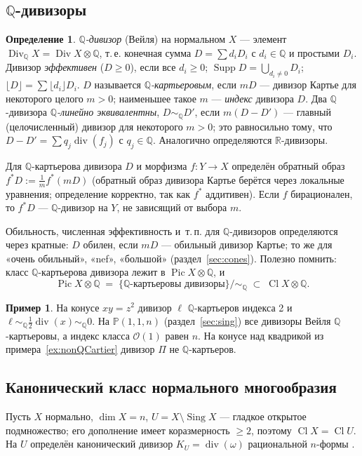 \documentclass[11pt,a4paper]{article}
\theoremstyle{plain}
\theoremstyle{definition}
\newtheorem{definition}[theorem]{Определение}
\newtheorem{example}[theorem]{Пример}
\theoremstyle{remark}
\newcommand{\Q}{\mathbb{Q}}
\newcommand{\R}{\mathbb{R}}
\newcommand{\PP}{\mathbb{P}}
\newcommand{\cO}{\mathcal{O}}
\DeclareMathOperator{\Pic}{Pic}
\DeclareMathOperator{\Cl}{Cl}
\DeclareMathOperator{\Div}{Div}
\DeclareMathOperator{\divv}{div}
\DeclareMathOperator{\Sing}{Sing}
\DeclareMathOperator{\Supp}{Supp}
\begin{document}
\subsection{$\Q$-дивизоры}

\begin{definition}
\emph{$\Q$-дивизор} (Вейля) на нормальном $X$ --- элемент $\Div_\Q X=\Div X\otimes\Q$, т.\,е.
конечная сумма $D=\sum d_iD_i$ с $d_i\in\Q$ и простыми $D_i$. Дивизор \emph{эффективен}
($D\ge0$), если все $d_i\ge0$; $\Supp D=\bigcup_{d_i\ne0}D_i$; $\lfloor D\rfloor=\sum\lfloor d_i\rfloor D_i$.
$D$ называется \emph{$\Q$-картьеровым}, если $mD$ --- дивизор Картье для некоторого целого $m>0$;
наименьшее такое $m$ --- \emph{индекс} дивизора $D$. Два $\Q$-дивизора \emph{$\Q$-линейно
эквивалентны}, $D\sim_\Q D'$, если $m(D-D')$ --- главный (целочисленный) дивизор для некоторого
$m>0$; это равносильно тому, что $D-D'=\sum q_j\divv(f_j)$ с $q_j\in\Q$. Аналогично определяются
$\R$-дивизоры.
\end{definition}

Для $\Q$-картьерова дивизора $D$ и морфизма $f\colon Y\to X$ определён обратный образ
$f^*D:=\frac1m f^*(mD)$ (обратный образ дивизора Картье берётся через локальные уравнения;
определение корректно, так как $f^*$ аддитивен). Если $f$ бирационален, то $f^*D$ --- $\Q$-дивизор
на $Y$, не зависящий от выбора $m$.

Обильность, численная эффективность и~т.\,п. для $\Q$-дивизоров определяются через кратные:
$D$ обилен, если $mD$ --- обильный дивизор Картье; то же для «очень обильный», «nef», «большой»
(раздел~\ref{sec:cones}). Полезно помнить: класс $\Q$-картьерова дивизора лежит в $\Pic X\otimes\Q$,
и
\[
\Pic X\otimes\Q\;=\;\{\text{$\Q$-картьеровы дивизоры}\}/{\sim_\Q}\;\subset\;\Cl X\otimes\Q .
\]

\begin{example}
На конусе $xy=z^2$ дивизор $\ell$ $\Q$-картьеров индекса 2 и $\ell\sim_\Q\frac12\divv(x)\sim_\Q0$.
На $\PP(1,1,n)$ (раздел~\ref{sec:sing}) все дивизоры Вейля $\Q$-картьеровы, а индекс класса
$\cO(1)$ равен $n$. На конусе над квадрикой из примера~\ref{ex:nonQCartier} дивизор $\Pi$ не
$\Q$-картьеров.
\end{example}

\subsection{Канонический класс нормального многообразия}\label{ss:canonical-normal}

Пусть $X$ нормально, $\dim X=n$, $U=X\setminus\Sing X$ --- гладкое открытое подмножество; его
дополнение имеет коразмерность $\ge2$, поэтому $\Cl X=\Cl U$. На $U$ определён канонический дивизор
$K_U=\divv(\omega)$ рациональной $n$-формы \cite[\S\,3]{AG}.
\end{document}
